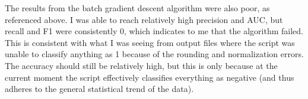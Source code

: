 \documentclass[11pt,a4paper]{article}
\begin{document}
The results from the batch gradient descent algorithm were also poor, as referenced above. I was able to reach relatively high precision and AUC, but recall and F1 were consistently 0, which indicates to me that the algorithm failed. This is consistent with what I was seeing from output files where the script was unable to classify anything as 1 because of the rounding and normalization errors. The accuracy should still be relatively high, but this is only because at the current moment the script effectively classifies everything as negative (and thus adheres to the general statistical trend of the data).
\end{document}
